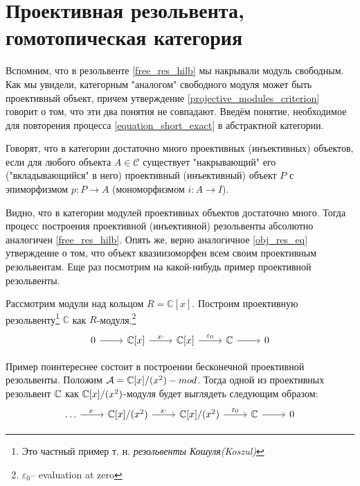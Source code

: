 \documentclass[../main.tex]{subfiles}
\begin{document}
\section{Проективная резольвента, гомотопическая категория}
Вспомним, что в резольвенте \eqref{free_res_hilb} мы накрывали модуль свободным. Как мы увидели, категорным "аналогом" свободного модуля может быть проективный объект, причем утверждение \ref{projective_modules_criterion} говорит о том, что эти два понятия не совпадают. Введём понятие, необходимое для повторения процесса \eqref{equation_short_exact} в абстрактной категории.
\begin{to_def}
Говорят, что в категории достаточно много проективных (инъективных) объектов, если для любого объекта $A\in \mathcal{C}$ существует "накрывающий" его ("вкладывающийся" в него) проективный (инъективный) объект $P$ с эпиморфизмом $p:P \to A$ (мономорфизмом $i:A\to I$).
\end{to_def}
Видно, что в категории модулей проективных объектов достаточно много. Тогда процесс построения проективной (инъективной) резольвенты абсолютно аналогичен \eqref{free_res_hilb}. Опять же, верно аналогичное \ref{obj_res_eq} утверждение о том, что объект квазиизоморфен всем своим проективным резольвентам. Еще раз посмотрим на какой-нибудь пример проективной резольвенты.
\begin{to_ex}
Рассмотрим модули над кольцом $R=\mathbb{C}[x]$. Построим проективную резольвенту\footnote{Это частный пример т. н. \emph{резольвенты Кошуля(Koszul)}} $\mathbb{C}$ как $R$-модуля.\footnote{$\varepsilon_0$-- evaluation at zero}
\begin{equation*}
    \begin{tikzcd}
	0 & {\mathbb{C}[x]} & {\mathbb{C}[x]} & \mathbb{C} & 0
	\arrow[from=1-1, to=1-2]
	\arrow["x\cdot", from=1-2, to=1-3]
	\arrow["\varepsilon_0",from=1-3, to=1-4]
	\arrow[from=1-4, to=1-5]
\end{tikzcd}
\end{equation*}
\end{to_ex}
\begin{to_ex}
Пример поинтереснее состоит в построении бесконечной проективной резольвенты. Положим $\mathcal{A} = \mathbb{C}[x]/(x^2)-mod$. Тогда одной из проективных резольвент $\mathbb{C}$ как $\mathbb{C}[x]/(x^2)$-модуля будет выглядеть следующим образом:
\begin{equation*}
    \begin{tikzcd}
	\ldots & {\C[x]/(x^2)} & {\C[x]/(x^2)} & \C & 0
	\arrow["x\cdot", from=1-1, to=1-2]
	\arrow["x\cdot", from=1-2, to=1-3]
	\arrow["\varepsilon_0", from=1-3, to=1-4]
	\arrow[from=1-4, to=1-5]
\end{tikzcd}
\end{equation*}
\end{to_ex}
\end{document}
